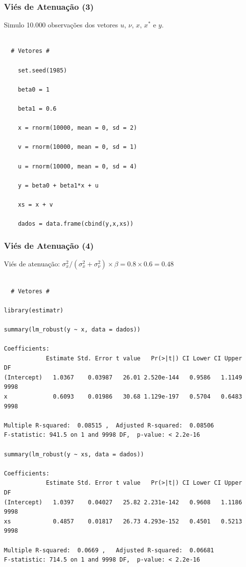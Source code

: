 \documentclass[10pt,slides,xcolor=pdftex,dvipsnames,table]{beamer}
\begin{document}

\begin{frame}[fragile]
	\frametitle{Viés de Atenuação (3)}

\vspace{0.5cm}
Simulo 10.000 observações dos vetores $u$, $\nu$, $x$, $x^*$ e $y$.

\begin{lstlisting}

  # Vetores # 
    
	set.seed(1985)
   
	beta0 = 1

	beta1 = 0.6

	x = rnorm(10000, mean = 0, sd = 2)
 
	v = rnorm(10000, mean = 0, sd = 1)

	u = rnorm(10000, mean = 0, sd = 4)
 
	y = beta0 + beta1*x + u
	
	xs = x + v
  
	dados = data.frame(cbind(y,x,xs))

\end{lstlisting}

\end{frame}


\begin{frame}[fragile]
	\frametitle{Viés de Atenuação (4)}

\vspace{0.5cm}
Viés de atenuação: $\sigma_x^2/(\sigma_x^2 + \sigma_{\nu}^2) \times \beta = 0.8 \times 0.6 = 0.48$ 

\begin{lstlisting}

  # Vetores # 
    
library(estimatr)
 
summary(lm_robust(y ~ x, data = dados))

Coefficients:
            Estimate Std. Error t value   Pr(>|t|) CI Lower CI Upper   DF
(Intercept)   1.0367    0.03987   26.01 2.520e-144   0.9586   1.1149 9998
x             0.6093    0.01986   30.68 1.129e-197   0.5704   0.6483 9998

Multiple R-squared:  0.08515 ,	Adjusted R-squared:  0.08506 
F-statistic: 941.5 on 1 and 9998 DF,  p-value: < 2.2e-16

summary(lm_robust(y ~ xs, data = dados))

Coefficients:
            Estimate Std. Error t value   Pr(>|t|) CI Lower CI Upper   DF
(Intercept)   1.0397    0.04027   25.82 2.231e-142   0.9608   1.1186 9998
xs            0.4857    0.01817   26.73 4.293e-152   0.4501   0.5213 9998

Multiple R-squared:  0.0669 ,	Adjusted R-squared:  0.06681 
F-statistic: 714.5 on 1 and 9998 DF,  p-value: < 2.2e-16

\end{lstlisting}

\end{frame}
\end{document}
